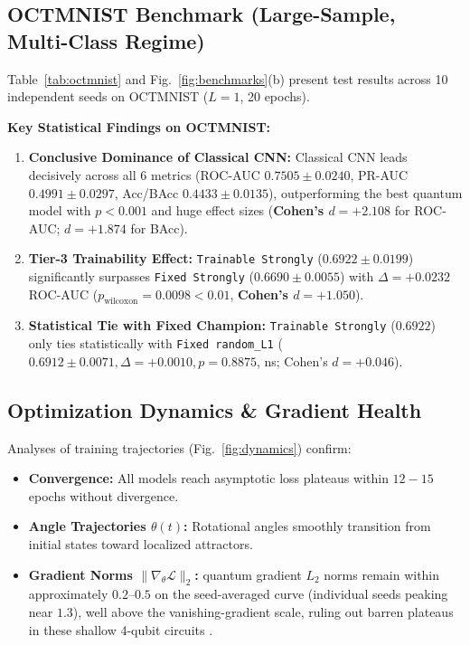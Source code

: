 \documentclass[journal]{IEEEtran}
\begin{document}
\subsection{OCTMNIST Benchmark (Large-Sample, Multi-Class Regime)}
Table~\ref{tab:octmnist} and Fig.~\ref{fig:benchmarks}(b) present test results across 10 independent seeds on OCTMNIST ($L=1$, 20 epochs).

\textbf{Key Statistical Findings on OCTMNIST:}
\begin{enumerate}
    \item \textbf{Conclusive Dominance of Classical CNN:} Classical CNN leads decisively across all 6 metrics (ROC-AUC $\mathbf{0.7505 \pm 0.0240}$, PR-AUC $\mathbf{0.4991 \pm 0.0297}$, Acc/BAcc $\mathbf{0.4433 \pm 0.0135}$), outperforming the best quantum model with $p < 0.001$ and huge effect sizes (\textbf{Cohen's $d = +2.108$} for ROC-AUC; \textbf{$d = +1.874$} for BAcc).
    \item \textbf{Tier-3 Trainability Effect:} \texttt{Trainable Strongly} ($0.6922 \pm 0.0199$) significantly surpasses \texttt{Fixed Strongly} ($0.6690 \pm 0.0055$) with $\Delta = +0.0232$ ROC-AUC ($p_{\text{wilcoxon}} = 0.0098 < 0.01$, \textbf{Cohen's $d = +1.050$}).
    \item \textbf{Statistical Tie with Fixed Champion:} \texttt{Trainable Strongly} ($0.6922$) only ties statistically with \texttt{Fixed random\_L1} ($0.6912 \pm 0.0071, \Delta = +0.0010, p = 0.8875$, ns; Cohen's $d = +0.046$).
\end{enumerate}

\subsection{Optimization Dynamics \& Gradient Health}
Analyses of training trajectories (Fig.~\ref{fig:dynamics}) confirm:
\begin{itemize}
    \item \textbf{Convergence:} All models reach asymptotic loss plateaus within $12 - 15$ epochs without divergence.
    \item \textbf{Angle Trajectories $\theta(t)$:} Rotational angles smoothly transition from initial states toward localized attractors.
    \item \textbf{Gradient Norms $\|\nabla_\theta \mathcal{L}\|_2$:} quantum gradient $L_2$ norms remain within approximately $0.2$--$0.5$ on the seed-averaged curve (individual seeds peaking near $1.3$), well above the vanishing-gradient scale, ruling out barren plateaus in these shallow 4-qubit circuits \cite{mcclean2018barren}.
\end{itemize}
\end{document}
